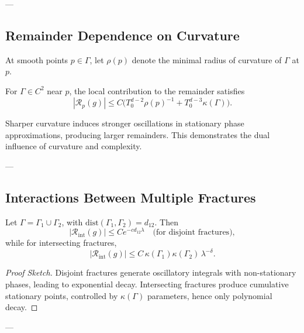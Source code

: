 ---

\subsection{Remainder Dependence on Curvature}

\begin{definition}
\label{def:curvature}
At smooth points $p \in \Gamma$, 
let $\rho(p)$ denote the minimal radius of curvature of $\Gamma$ at $p$.  
\end{definition}

\begin{theorem}
\label{thm:curvature}
For $\Gamma \in C^2$ near $p$,  
the local contribution to the remainder satisfies
\[
|\mathcal{R}_p(g)| 
\leq C \Big( T_0^{d-2}\rho(p)^{-1} + T_0^{d-3}\kappa(\Gamma) \Big).
\]
\end{theorem}

\begin{remark}
Sharper curvature induces stronger oscillations 
in stationary phase approximations, 
producing larger remainders.  
This demonstrates the dual influence of curvature and complexity.
\end{remark}

---

\subsection{Interactions Between Multiple Fractures}

\begin{theorem}
\label{thm:interaction}
Let $\Gamma = \Gamma_1 \cup \Gamma_2$, 
with $\mathrm{dist}(\Gamma_1,\Gamma_2) = d_{12}$.  
Then
\[
|\mathcal{R}_{\mathrm{int}}(g)| 
\leq C e^{-c d_{12}\lambda} \quad \text{(for disjoint fractures)},
\]
while for intersecting fractures,
\[
|\mathcal{R}_{\mathrm{int}}(g)| 
\leq C \, \kappa(\Gamma_1)\kappa(\Gamma_2) \, \lambda^{-\delta}.
\]
\end{theorem}

\begin{proof}[Proof Sketch]
Disjoint fractures generate oscillatory integrals 
with non-stationary phases, leading to exponential decay.  
Intersecting fractures produce cumulative stationary points, 
controlled by $\kappa(\Gamma)$ parameters, 
hence only polynomial decay.  
\end{proof}

---

